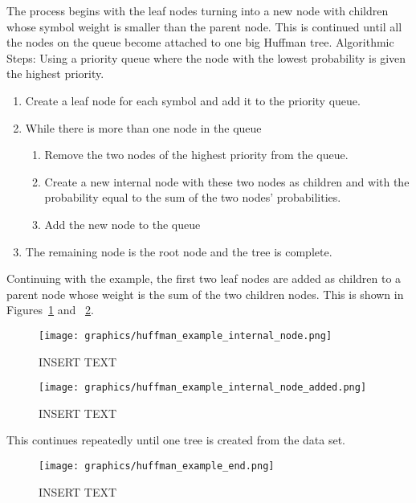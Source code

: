 \documentclass[letterpaper, 12pt]{article}
\begin{document}
The process begins with the leaf nodes turning into a new node with children whose symbol weight is smaller than
the parent node. This is continued until all the nodes on the queue become attached to one big Huffman tree.
Algorithmic Steps:
Using a priority queue where the node with the lowest probability is given the highest priority.
\begin{enumerate}
 \item Create a leaf node for each symbol and add it to the priority queue.
 \item While there is more than one node in the queue
 \begin{enumerate}
    \item Remove the two nodes of the highest priority from the queue.
    \item Create a new internal node with these two nodes as children and with the probability equal to
	  the sum of the two nodes' probabilities.
    \item Add the new node to the queue
  \end{enumerate}
  \item The remaining node is the root node and the tree is complete.
\end{enumerate}

Continuing with the example, the first two leaf nodes are added as children to a parent node whose
weight is the sum of the two children nodes. This is shown in Figures~\ref{fig:huffman_ex_int_1} and
~\ref{fig:huffman_ex_int_2}.
\par\vspace{\baselineskip}

\begin{figure}
  \centering
  \texttt{[image: graphics/huffman\_example\_internal\_node.png]}
  \caption{INSERT TEXT}
  \label{fig:huffman_ex_int_1}
\end{figure}

\begin{figure}
  \centering
  \texttt{[image: graphics/huffman\_example\_internal\_node\_added.png]}
  \caption{INSERT TEXT}
  \label{fig:huffman_ex_int_2}
\end{figure}

This continues repeatedly until one tree is created from the data set.
\par\vspace{\baselineskip}

\begin{figure}
  \centering
  \texttt{[image: graphics/huffman\_example\_end.png]}
  \caption{INSERT TEXT}
\end{figure}
\end{document}
